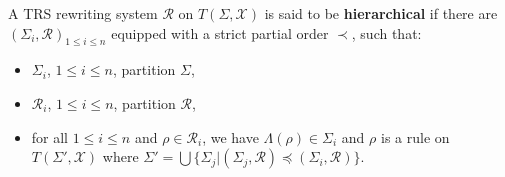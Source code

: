  \begin{definition}
    A TRS rewriting system $\mathcal{R}$ on $T(\Sigma, \mathcal{X})$ is said to be \textbf{hierarchical} if there are $(\Sigma_i, \mathcal{R})_{1 \leq i \leq n}$ equipped with a strict partial order $\prec$, such that:
    \begin{itemize}
      \item $\Sigma_i$, $1 \leq i \leq n$, partition $\Sigma$,
      \item $\mathcal{R}_i$, $1 \leq i \leq n$, partition $\mathcal{R}$,
      \item for all $1 \leq i \leq n$ and $\rho \mathop{\in} \mathcal{R}_i$, we have $\Lambda(\rho) \mathop{\in} \Sigma_i$ and $\rho$ is a rule on $T(\Sigma', \mathcal{X})$ where 
      $\Sigma' \mathop{=} \bigcup \{ \Sigma_j | (\Sigma_j, \mathcal{R}) \mathop{\preceq} (\Sigma_i, \mathcal{R}) \}$.
    \end{itemize}
  \end{definition}


  
  
  
